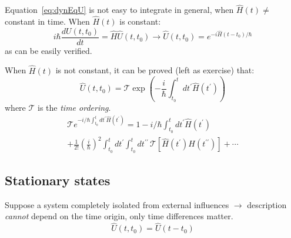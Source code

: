 \documentclass[12pt]{article}
\begin{document}
Equation~\eqref{eq:dynEqU} is not easy to integrate in general,
when $\hat{H}(t) \neq$ constant in time.
When $\hat{H}(t)$ is constant:
\begin{equation}
i \hbar \frac{d U\left(t, t_{0}\right)}{d t}=\hat{H} \hat{U}\left(t, t_{0}\right)
\to
\hat{U}\left(t, t_{0}\right)=e^{-i \hat{H}\left(t-t_{0}\right) / \hbar}
\label{eq:g44}
\end{equation}
as can be easily verified.

When $\hat{H}(t)$ is not constant, it can be proved (left as exercise) that:
\begin{equation}
\hat{U}\left(t, t_{0}\right)=\mathcal{T} \exp\left(
-\frac{i}{\hbar} \int_{t_{0}}^{t} d t^{\prime} \hat{H}\left(t^{\prime}\right)
\right)
\end{equation} 
where $\mathcal{T}$ is the \emph{time ordering}.
\begin{equation}
\begin{gathered}
\mathcal{T} e^{-i/\hbar \int_{t_{0}}^{t} d t^{\prime} \hat{H}(t^\prime)} = 1 
-i / \hbar \int_{t_{0}}^{t} dt^{\prime} \hat{H}\left(t^{\prime}\right)\\
+
\frac{1}{2 !}\left(\frac{i}{\hbar}\right)^{2} \int_{t_{0}}^{t} d t^{\prime} \int_{t_{0}}^{t} d t^{\prime \prime} \, \mathcal{T}\left[\hat{H}\left(t^{\prime}\right) H\left(t^{\prime \prime}\right)\right]+\cdots
\end{gathered}
\end{equation}

\subsection{Stationary states}

Suppose a system completely isolated from 
external influences $\to$ description \emph{cannot} depend
on the time origin, only time differences matter.
\begin{equation}
\hat{U}\left(t, t_{0}\right)=\hat{U}\left(t-t_{0}\right)
\end{equation}

\end{document}
